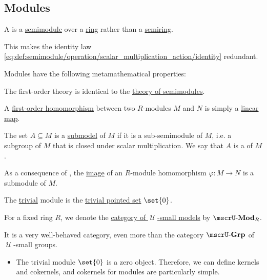 \subsection{Modules}\label{subsec:modules}

\begin{definition}\label{def:module}
  A  is a \hyperref[def:semimodule]{semimodule} over a \hyperref[def:ring]{ring} rather than a \hyperref[def:semiring]{semiring}.

  This makes the identity law \eqref{eq:def:semimodule/operation/scalar_multiplication_action/identity} redundant.

  Modules have the following metamathematical properties:
  \begin{thmenum}
     The first-order theory is identical to the \hyperref[def:semimodule/theory]{theory of semimodules}.

     A \hyperref[def:first_order_homomorphism]{first-order homomorphism} between two \( R \)-modules \( M \) and \( N \) is simply a \hyperref[def:semimodule/homomorphism]{linear map}.

     The set \( A \subseteq M \) is a \hyperref[thm:substructure_is_model]{submodel} of \( M \) if it is a sub-semimodule of \( M \), i.e. a subgroup of \( M \) that is closed under scalar multiplication. We say that \( A \) is a  of \( M \).

    As a consequence of , the \hyperref[def:multi_valued_function/image]{image} of an \( R \)-module homomorphism \( \varphi: M \to N \) is a submodule of \( M \).

     The \hyperref[thm:substructures_form_complete_lattice/bottom]{trivial} module is the \hyperref[def:pointed_set/trivial]{trivial pointed set} \( \set{ 0 } \).

     For a fixed ring \( R \), we denote the \hyperref[def:category_of_small_first_order_models]{category of \( \mscrU \)-small models} by \( \ucat{Mod}_R \).

    It is a very well-behaved category, even more than the category \hyperref[def:group/category]{\( \ucat{Grp} \)} of \( \mscrU \)-small groups.
    \begin{itemize}
      \item The trivial module \( \set{ 0 } \) is a zero object. Therefore, we can define kernels and cokernels, and cokernels for modules are particularly simple.


\end{itemize}
\end{thmenum}
\end{definition}
